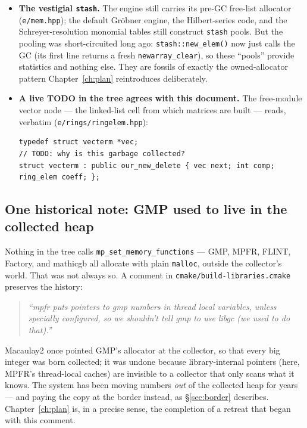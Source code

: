 \documentclass[11pt,oneside]{report}
\newcommand{\code}[1]{\textcolor{m2code}{\texttt{#1}}}
\newcommand{\file}[1]{\textcolor{m2file}{\texttt{#1}}}
\begin{document}
\begin{itemize}
\item \textbf{The vestigial \code{stash}.} The engine still carries its
  pre-GC free-list allocator (\file{e/mem.hpp}); the default Gr\"obner
  engine, the Hilbert-series code, and the Schreyer-resolution monomial
  tables still construct \code{stash} pools. But the pooling was
  short-circuited long ago: \code{stash::new\_elem()} now just calls the GC
  (its first line returns a fresh \code{newarray\_clear}), so these ``pools''
  provide statistics and nothing else. They are fossils of exactly the
  owned-allocator pattern Chapter~\ref{ch:plan} reintroduces deliberately.
\item \textbf{A live TODO in the tree agrees with this document.} The
  free-module vector node --- the linked-list cell from which matrices are
  built --- reads, verbatim (\file{e/rings/ringelem.hpp}):
\begin{lstlisting}
typedef struct vecterm *vec;
// TODO: why is this garbage collected?
struct vecterm : public our_new_delete { vec next; int comp; ring_elem coeff; };
\end{lstlisting}
\end{itemize}

\subsection{One historical note: GMP used to live in the collected heap}
\label{sec:gmphistory}

Nothing in the tree calls \code{mp\_set\_memory\_functions} --- GMP, MPFR,
FLINT, Factory, and mathicgb all allocate with plain \code{malloc}, outside
the collector's world. That was not always so. A comment in
\file{cmake/build-libraries.cmake} preserves the history:

\begin{quote}\itshape
``mpfr puts pointers to gmp numbers in thread local variables, unless
specially configured, so we shouldn't tell gmp to use libgc (we used to do
that).''
\end{quote}

\noindent Macaulay2 once pointed GMP's allocator at the collector, so that
every big integer was born collected; it was undone because library-internal
pointers (here, MPFR's thread-local caches) are invisible to a collector
that only scans what it knows. The system has been moving numbers \emph{out}
of the collected heap for years --- and paying the copy at the border
instead, as \S\ref{sec:border} describes. Chapter~\ref{ch:plan} is, in a
precise sense, the completion of a retreat that began with this comment.
\end{document}
